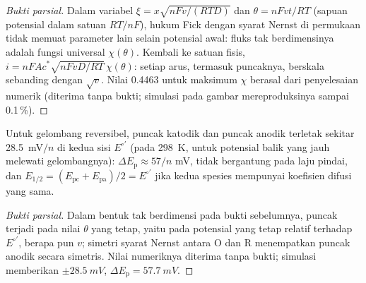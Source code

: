 \begin{proof}[Bukti parsial]
Dalam variabel $\xi = x\sqrt{nFv/(RTD)}$ dan $\theta = nFvt/RT$ (sapuan potensial
dalam satuan $RT/nF$), hukum Fick dengan syarat Nernst di permukaan tidak
memuat parameter lain selain potensial awal: fluks tak berdimensinya adalah
fungsi universal $\chi(\theta)$. Kembali ke satuan fisis,
$i = nFAc^*\sqrt{nFvD/RT}\,\chi(\theta)$: setiap arus, termasuk puncaknya,
berskala sebanding dengan $\sqrt v$. Nilai 0.4463 untuk maksimum $\chi$ berasal
dari penyelesaian numerik (diterima tanpa bukti; simulasi pada gambar
mereproduksinya sampai 0.1\,\%).
\end{proof}

\begin{proposition}\label{prop:b3:electrode-kinetics:delta-ep}
Untuk gelombang reversibel, puncak katodik dan puncak anodik terletak sekitar
\qty{28.5}{mV}$/n$ di kedua sisi $E^{\circ\prime}$ (pada \qty{298}{K}, untuk potensial
balik yang jauh melewati gelombangnya): $\Delta E_{\mathrm p} \approx 57/n$ mV, tidak
bergantung pada laju pindai, dan $E_{1/2} = (E_{\mathrm{pc}} + E_{\mathrm{pa}})/2 =
E^{\circ\prime}$ jika kedua spesies mempunyai koefisien difusi yang sama.
\end{proposition}

\begin{proof}[Bukti parsial]
Dalam bentuk tak berdimensi pada bukti sebelumnya, puncak terjadi pada nilai
$\theta$ yang tetap, yaitu pada potensial yang tetap relatif terhadap
$E^{\circ\prime}$, berapa pun $v$; simetri syarat Nernst antara O dan R menempatkan
puncak anodik secara simetris. Nilai numeriknya diterima tanpa bukti;
simulasi memberikan $\pm\qty{28.5}{mV}$, $\Delta E_{\mathrm p} = \qty{57.7}{mV}$.
\end{proof}


